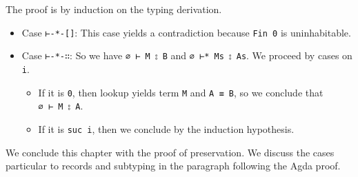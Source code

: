The proof is by induction on the typing derivation.

\begin{itemize}
\item
  Case \texttt{⊢-*-{[}{]}}: This case yields a contradiction because
  \texttt{Fin\ 0} is uninhabitable.
\item
  Case \texttt{⊢-*-∷}: So we have \texttt{∅\ ⊢\ M\ ⦂\ B} and
  \texttt{∅\ ⊢*\ Ms\ ⦂\ As}. We proceed by cases on \texttt{i}.

  \begin{itemize}
  \item
    If it is \texttt{0}, then lookup yields term \texttt{M} and
    \texttt{A\ ≡\ B}, so we conclude that \texttt{∅\ ⊢\ M\ ⦂\ A}.
  \item
    If it is \texttt{suc\ i}, then we conclude by the induction
    hypothesis.
  \end{itemize}
\end{itemize}

We conclude this chapter with the proof of preservation. We discuss the
cases particular to records and subtyping in the paragraph following the
Agda proof.

